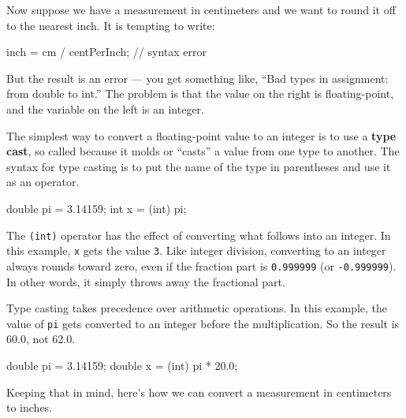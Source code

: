 \documentclass[12pt]{book}
\theoremstyle{exercise}
\newcommand{\java}[1]{\verb"#1"}
\newcommand{\java}[1]{\lstinline{#1}} %
\begin{document}
Now suppose we have a measurement in centimeters and we want to round it off to the nearest inch.
It is tempting to write:

\begin{code}
    inch = cm / centPerInch;  // syntax error
\end{code}

But the result is an error --- you get something like, ``Bad types in assignment: from double to int.''
The problem is that the value on the right is floating-point, and the variable on the left is an integer.



The simplest way to convert a floating-point value to an integer is to use a {\bf type cast}, so called because it molds or ``casts'' a value from one type to another.
The syntax for type casting is to put the name of the type in parentheses and use it as an operator.

\begin{code}
    double pi = 3.14159;
    int x = (int) pi;
\end{code}

The \java{(int)} operator has the effect of converting what follows into an integer.
In this example, \java{x} gets the value \java{3}.
Like integer division, converting to an integer always rounds toward zero, even if the fraction part is \java{0.999999} (or \java{-0.999999}).
In other words, it simply throws away the fractional part.

Type casting takes precedence over arithmetic operations.
In this example, the value of \java{pi} gets converted to an integer before the multiplication.
So the result is 60.0, not 62.0.

\begin{code}
    double pi = 3.14159;
    double x = (int) pi * 20.0;
\end{code}


Keeping that in mind, here's how we can convert a measurement in centimeters to inches.
\end{document}
